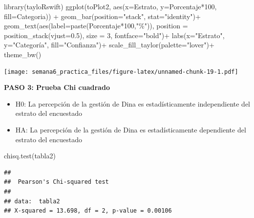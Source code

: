 \documentclass[
]{article}
\newenvironment{Shaded}{\begin{snugshade}}{\end{snugshade}}
\newcommand{\AttributeTok}[1]{\textcolor[rgb]{0.77,0.63,0.00}{#1}}
\newcommand{\DecValTok}[1]{\textcolor[rgb]{0.00,0.00,0.81}{#1}}
\newcommand{\FloatTok}[1]{\textcolor[rgb]{0.00,0.00,0.81}{#1}}
\newcommand{\FunctionTok}[1]{\textcolor[rgb]{0.00,0.00,0.00}{#1}}
\newcommand{\NormalTok}[1]{#1}
\newcommand{\SpecialCharTok}[1]{\textcolor[rgb]{0.00,0.00,0.00}{#1}}
\newcommand{\StringTok}[1]{\textcolor[rgb]{0.31,0.60,0.02}{#1}}
\begin{document}
\begin{Shaded}
\begin{Highlighting}[]
\FunctionTok{library}\NormalTok{(tayloRswift)}
  \FunctionTok{ggplot}\NormalTok{(toPlot2, }\FunctionTok{aes}\NormalTok{(}\AttributeTok{x=}\NormalTok{Estrato, }\AttributeTok{y=}\NormalTok{Porcentaje}\SpecialCharTok{*}\DecValTok{100}\NormalTok{, }\AttributeTok{fill=}\NormalTok{Categoria)) }\SpecialCharTok{+}
  \FunctionTok{geom\_bar}\NormalTok{(}\AttributeTok{position=}\StringTok{"stack"}\NormalTok{, }\AttributeTok{stat=}\StringTok{"identity"}\NormalTok{)}\SpecialCharTok{+}
  \FunctionTok{geom\_text}\NormalTok{(}\FunctionTok{aes}\NormalTok{(}\AttributeTok{label=}\FunctionTok{paste}\NormalTok{(Porcentaje}\SpecialCharTok{*}\DecValTok{100}\NormalTok{,}\StringTok{"\%"}\NormalTok{)), }
            \AttributeTok{position =} \FunctionTok{position\_stack}\NormalTok{(}\AttributeTok{vjust=}\FloatTok{0.5}\NormalTok{), }
             \AttributeTok{size =} \DecValTok{3}\NormalTok{, }\AttributeTok{fontface=}\StringTok{"bold"}\NormalTok{)}\SpecialCharTok{+}
  \FunctionTok{labs}\NormalTok{(}\AttributeTok{x=}\StringTok{"Estrato"}\NormalTok{, }\AttributeTok{y=}\StringTok{"Categoría"}\NormalTok{, }\AttributeTok{fill=}\StringTok{"Confianza"}\NormalTok{)}\SpecialCharTok{+}
    \FunctionTok{scale\_fill\_taylor}\NormalTok{(}\AttributeTok{palette=}\StringTok{"lover"}\NormalTok{)}\SpecialCharTok{+}
  \FunctionTok{theme\_bw}\NormalTok{()}
\end{Highlighting}
\end{Shaded}

\texttt{[image: semana6\_practica\_files/figure-latex/unnamed-chunk-19-1.pdf]}

\textbf{PASO 3: Prueba Chi cuadrado}

\begin{itemize}
\item
  H0: La percepción de la gestión de Dina es estadísticamente
  independiente del estrato del encuestado
\item
  HA: La percepción de la gestión de Dina es estadísticamente
  dependiente del estrato del encuestado
\end{itemize}

\begin{Shaded}
\begin{Highlighting}[]
\FunctionTok{chisq.test}\NormalTok{(tabla2)}
\end{Highlighting}
\end{Shaded}

\begin{verbatim}
## 
##  Pearson's Chi-squared test
## 
## data:  tabla2
## X-squared = 13.698, df = 2, p-value = 0.00106
\end{verbatim}
\end{document}
